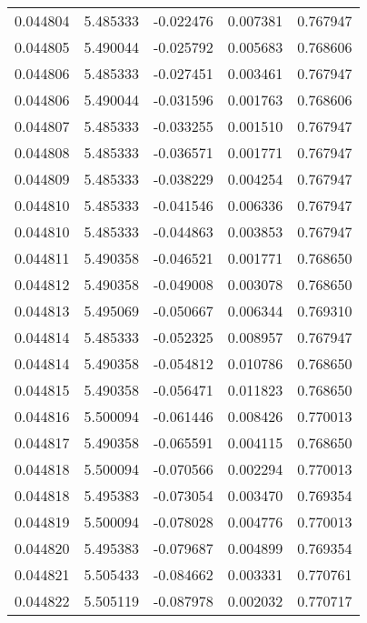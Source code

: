 \begin{tabular}{lrrrr}
0.044804    &  5.485333 & -0.022476 &  0.007381 &             0.767947 \\
0.044805    &  5.490044 & -0.025792 &  0.005683 &             0.768606 \\
0.044806    &  5.485333 & -0.027451 &  0.003461 &             0.767947 \\
0.044806    &  5.490044 & -0.031596 &  0.001763 &             0.768606 \\
0.044807    &  5.485333 & -0.033255 &  0.001510 &             0.767947 \\
0.044808    &  5.485333 & -0.036571 &  0.001771 &             0.767947 \\
0.044809    &  5.485333 & -0.038229 &  0.004254 &             0.767947 \\
0.044810    &  5.485333 & -0.041546 &  0.006336 &             0.767947 \\
0.044810    &  5.485333 & -0.044863 &  0.003853 &             0.767947 \\
0.044811    &  5.490358 & -0.046521 &  0.001771 &             0.768650 \\
0.044812    &  5.490358 & -0.049008 &  0.003078 &             0.768650 \\
0.044813    &  5.495069 & -0.050667 &  0.006344 &             0.769310 \\
0.044814    &  5.485333 & -0.052325 &  0.008957 &             0.767947 \\
0.044814    &  5.490358 & -0.054812 &  0.010786 &             0.768650 \\
0.044815    &  5.490358 & -0.056471 &  0.011823 &             0.768650 \\
0.044816    &  5.500094 & -0.061446 &  0.008426 &             0.770013 \\
0.044817    &  5.490358 & -0.065591 &  0.004115 &             0.768650 \\
0.044818    &  5.500094 & -0.070566 &  0.002294 &             0.770013 \\
0.044818    &  5.495383 & -0.073054 &  0.003470 &             0.769354 \\
0.044819    &  5.500094 & -0.078028 &  0.004776 &             0.770013 \\
0.044820    &  5.495383 & -0.079687 &  0.004899 &             0.769354 \\
0.044821    &  5.505433 & -0.084662 &  0.003331 &             0.770761 \\
0.044822    &  5.505119 & -0.087978 &  0.002032 &             0.770717 \\

\end{tabular}
